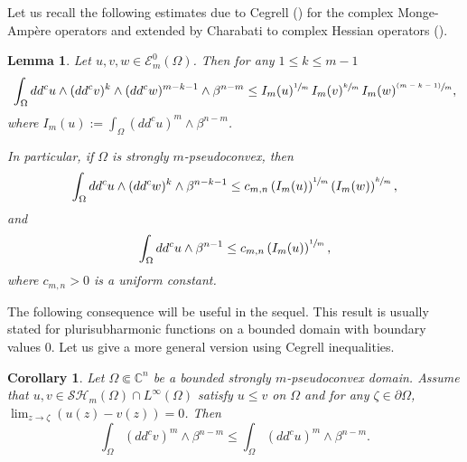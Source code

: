 \documentclass[11pt]{article}
\providecommand{\C}{}
\numberwithin{equation}{section}
\newcommand{\psfrac}[2]{\sfrac{(#1)}{#2}}
\newtheorem{lemma}[theorem]{Lemma}
\newtheorem{corollary}[theorem]{Corollary}
\theoremstyle{definition}
\renewcommand{\C}{\mathbb{C}}
\theoremstyle{plain}
\theoremstyle{definition}
\begin{document}
Let us recall the following estimates due to Cegrell (\cite{Ceg04}) for the complex Monge-Ampère operators and extended by Charabati to complex Hessian operators (\cite{Ch16}).

\begin{lemma} \label{lem:Cegrell} Let $u, v, w \in\mathcal{E}_m^0(\Omega)$. Then for any $1 \leq k \leq m - 1$
\[
\int_{\Omega}dd^cu\wedge(dd^cv)^k\wedge(dd^cw)^{m-k-1}\wedge\beta^{n-m}
\leq I_m (u)^{\sfrac{1}{m}} \, I_m (v)^{\sfrac{k}{m}} \, I_m (w)^{\psfrac{m-k-1}{m}},
\]
where $I_m (u):= \int_{\Omega}(dd^c u)^m \wedge \beta^{n-m}$.

In particular, if $\Omega$ is strongly $m$-pseudoconvex, then
\[
\int_{\Omega}dd^c u \wedge (dd^c w)^k \wedge\beta^{n-k -1} \leq c_{m,n} \left(I_m (u)\right)^{\sfrac{1}{m}} \left(I_m (w)\right)^{\sfrac{k}{m}},
\]
and
\[
\int_{\Omega}dd^c u \wedge \beta^{n-1} \leq c_{m,n} \left(I_m (u)\right)^{\sfrac{1}{m}},
\]
where $c_{m,n} > 0$ is a uniform constant.
\end{lemma}

The following consequence will be useful in the sequel. This result is usually stated for plurisubharmonic functions on a bounded domain with boundary values $0$. Let us give a more general version using Cegrell inequalities.

\begin{corollary} \label{coro:comparison principle} Let $\Omega \Subset \C^n$ be a bounded strongly $m$-pseudoconvex domain. Assume that $u,v\in \mathcal{SH}_m(\Omega)\cap L^{\infty}(\Omega)$ satisfy $u \leq v$ on $\Omega$ and for any $\zeta \in \partial \Omega$, $\lim_{z \to \zeta }(u(z)- v(z))= 0$.
Then
\[
\int_{\Omega}(dd^c v)^m\wedge\beta^{n-m} \leq \int_{\Omega}(dd^c u)^m\wedge\beta^{n-m}.
\]
\end{corollary}
\end{document}
